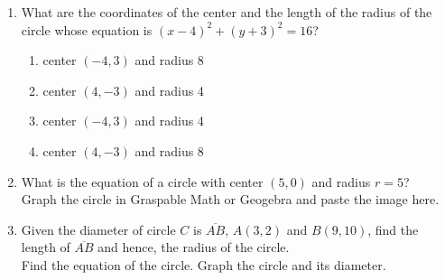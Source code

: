 \documentclass[12pt, twoside]{article}
\begin{document}
\begin{enumerate}
\newpage
\item What are the coordinates of the center and the length of the radius of the circle whose equation is $(x-4)^2+(y+3)^2=16$?
    \begin{enumerate}
      \item center $(-4,3)$ and radius 8
      \item center $(4,-3)$ and radius 4
      \item center $(-4,3)$ and radius 4
      \item center $(4,-3)$ and radius 8
    \end{enumerate}

\newpage
\item What is the equation of a circle with center $(5,0)$ and radius $r=5$?\\[0.5cm]
  Graph the circle in Graspable Math or Geogebra and paste the image here.

\newpage
\item Given the diameter of circle $C$ is $\overline{AB}$, $A(3,2)$ and $B(9,10)$, find the length of $\overline{AB}$ and hence, the radius of the circle.\\[0.25cm]
Find the equation of the circle. Graph the circle and its diameter.


\end{enumerate}
\end{document}
